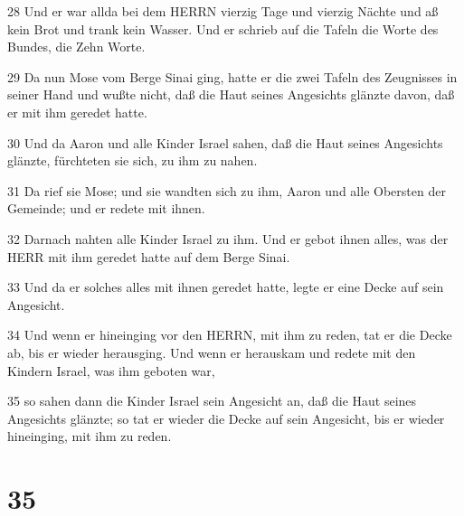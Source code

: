 \par 28 Und er war allda bei dem HERRN vierzig Tage und vierzig Nächte und aß kein Brot und trank kein Wasser. Und er schrieb auf die Tafeln die Worte des Bundes, die Zehn Worte.
\par 29 Da nun Mose vom Berge Sinai ging, hatte er die zwei Tafeln des Zeugnisses in seiner Hand und wußte nicht, daß die Haut seines Angesichts glänzte davon, daß er mit ihm geredet hatte.
\par 30 Und da Aaron und alle Kinder Israel sahen, daß die Haut seines Angesichts glänzte, fürchteten sie sich, zu ihm zu nahen.
\par 31 Da rief sie Mose; und sie wandten sich zu ihm, Aaron und alle Obersten der Gemeinde; und er redete mit ihnen.
\par 32 Darnach nahten alle Kinder Israel zu ihm. Und er gebot ihnen alles, was der HERR mit ihm geredet hatte auf dem Berge Sinai.
\par 33 Und da er solches alles mit ihnen geredet hatte, legte er eine Decke auf sein Angesicht.
\par 34 Und wenn er hineinging vor den HERRN, mit ihm zu reden, tat er die Decke ab, bis er wieder herausging. Und wenn er herauskam und redete mit den Kindern Israel, was ihm geboten war,
\par 35 so sahen dann die Kinder Israel sein Angesicht an, daß die Haut seines Angesichts glänzte; so tat er wieder die Decke auf sein Angesicht, bis er wieder hineinging, mit ihm zu reden.

\chapter{35}

